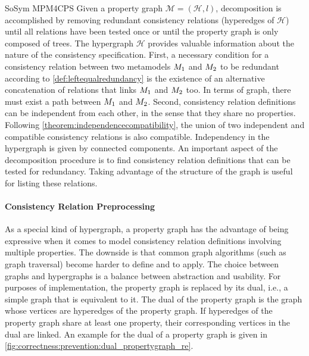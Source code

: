 \begin{copiedFrom}{SoSym MPM4CPS}
Given a property graph $\mathcal{M} = (\mathcal{H}, l)$, decomposition is accomplished by removing redundant consistency relations (hyperedges of $\mathcal{H}$) until all relations have been tested once or until the property graph is only composed of trees.
The hypergraph $\mathcal{H}$ provides valuable information about the nature of the consistency specification. First, a necessary condition for a consistency relation between two metamodels $M_{1}$ and $M_{2}$ to be redundant according to \autoref{def:leftequalredundancy} is the existence of an alternative concatenation of relations that links $M_{1}$ and $M_{2}$ too. In terms of graph, there must exist a path between $M_{1}$ and $M_{2}$. Second, consistency relation definitions can be independent from each other, in the sense that they share no properties. Following \autoref{theorem:independencecompatibility}, the union of two independent and compatible consistency relations is also compatible. Independency in the hypergraph is given by connected components. An important aspect of the decomposition procedure is to find consistency relation definitions that can be tested for redundancy. Taking advantage of the structure of the graph is useful for listing these relations.

\paragraph{Consistency Relation Preprocessing}
As a special kind of hypergraph, a property graph has the advantage of being expressive when it comes to model consistency relation definitions involving multiple properties. The downside is that common graph algorithms (such as graph traversal) become harder to define and to apply. The choice between graphs and hypergraphs is a balance between abstraction and usability. 
For purposes of implementation, the property graph is replaced by its dual, i.e., a simple graph that is equivalent to it. The dual of the property graph is the graph whose vertices are hyperedges of the property graph. If hyperedges of the property graph share at least one property, their corresponding vertices in the dual are linked. An example for the dual of a property graph is given in \autoref{fig:correctness:prevention:dual_propertygraph_re}.




\end{copiedFrom}
